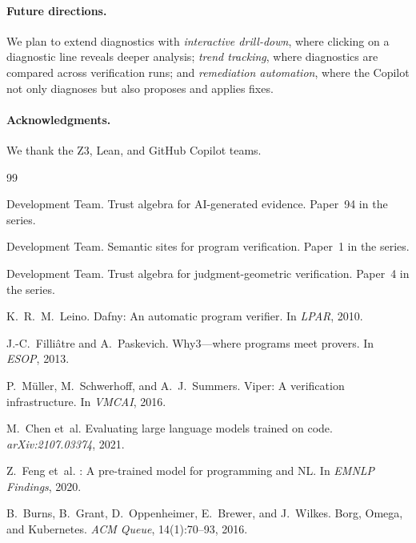 \documentclass[11pt]{article}
\begin{document}
\paragraph{Future directions.}
We plan to extend diagnostics with \emph{interactive drill-down}, where
clicking on a diagnostic line reveals deeper analysis; \emph{trend tracking},
where diagnostics are compared across verification runs; and
\emph{remediation automation}, where the Copilot not only diagnoses but also
proposes and applies fixes.

\paragraph{Acknowledgments.}
We thank the Z3, Lean, and GitHub Copilot teams.


\begin{thebibliography}{99}

\JuGeo{} Development Team.
\newblock Trust algebra for AI-generated evidence.
\newblock Paper~94 in the \JuGeo{} series.

\JuGeo{} Development Team.
\newblock Semantic sites for program verification.
\newblock Paper~1 in the \JuGeo{} series.

\JuGeo{} Development Team.
\newblock Trust algebra for judgment-geometric verification.
\newblock Paper~4 in the \JuGeo{} series.

K.~R.~M.~Leino.
\newblock Dafny: An automatic program verifier.
\newblock In \emph{LPAR}, 2010.

J.-C.~Filli\^{a}tre and A.~Paskevich.
\newblock Why3---where programs meet provers.
\newblock In \emph{ESOP}, 2013.

P.~M{\"u}ller, M.~Schwerhoff, and A.~J.~Summers.
\newblock Viper: A verification infrastructure.
\newblock In \emph{VMCAI}, 2016.

M.~Chen et~al.
\newblock Evaluating large language models trained on code.
\newblock \emph{arXiv:2107.03374}, 2021.

Z.~Feng et~al.
: A pre-trained model for programming and NL.
\newblock In \emph{EMNLP Findings}, 2020.

B.~Burns, B.~Grant, D.~Oppenheimer, E.~Brewer, and J.~Wilkes.
\newblock Borg, Omega, and Kubernetes.
\newblock \emph{ACM Queue}, 14(1):70--93, 2016.


\end{thebibliography}
\end{document}
